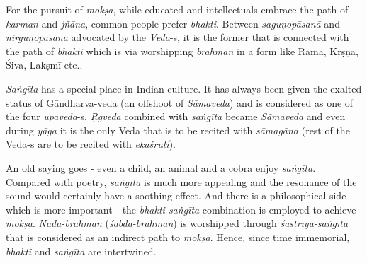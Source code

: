 For the pursuit of \textit{mokṣa}, while educated and intellectuals embrace the path of \textit{karman} and \textit{jñāna}, common people prefer \textit{bhakti}. Between \textit{saguṇopāsanā} and \textit{nirguṇopāsanā} advocated by the \textit{Veda}-s, it is the former that is connected with the path of \textit{bhakti} which is via worshipping \textit{brahman} in a form like Rāma, Kṛṣṇa, Śiva, Lakṣmī etc..

\textit{Saṅgīta} has a special place in Indian culture. It has always been given the exalted status of Gāndharva-veda (an offshoot of \textit{Sāmaveda}) and is considered as one of the four \textit{upaveda}-s. \textit{Ṛgveda} combined with \textit{saṅgīta} became \textit{Sāmaveda} and even during \textit{yāga} it is the only Veda that is to be recited with \textit{sāmagāna} (rest of the Veda-s are to be recited with \textit{ekaśruti}).

An old saying goes - even a child, an animal and a cobra enjoy \textit{saṅgīta}. Compared with poetry, \textit{saṅgīta} is much more appealing and the resonance of the sound would certainly have a soothing effect. And there is a philosophical side which is more important - the \textit{bhakti-saṅgīta} combination is employed to achieve \textit{mokṣa}. \textit{Nāda-brahman} (\textit{śabda-brahman}) is worshipped through \textit{śāstrīya-saṅgīta} that is considered as an indirect path to \textit{mokṣa}. Hence, since time immemorial, \textit{bhakti} and \textit{saṅgīta} are intertwined. 

